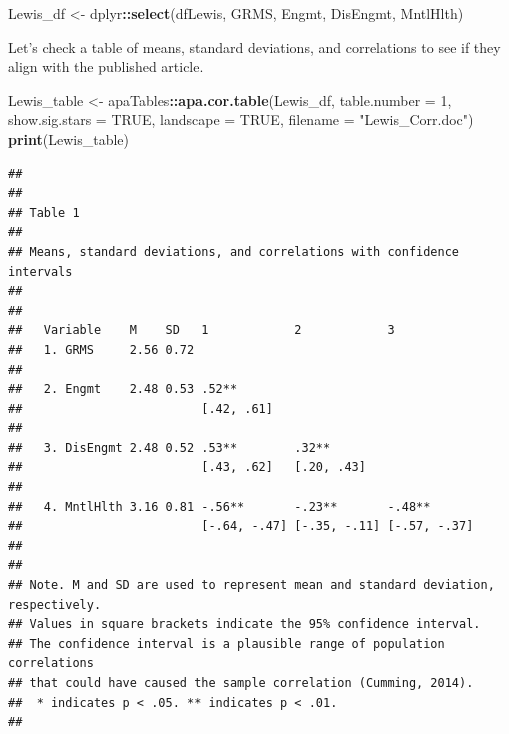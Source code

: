 \documentclass[
  11pt,
]{book}
\newenvironment{Shaded}{\begin{snugshade}}{\end{snugshade}}
\newcommand{\AttributeTok}[1]{\textcolor[rgb]{0.27,0.27,0.27}{#1}}
\newcommand{\ConstantTok}[1]{\textcolor[rgb]{0.37,0.37,0.37}{#1}}
\newcommand{\DecValTok}[1]{\textcolor[rgb]{0.06,0.06,0.06}{#1}}
\newcommand{\FunctionTok}[1]{\textcolor[rgb]{0.27,0.27,0.27}{\textbf{#1}}}
\newcommand{\NormalTok}[1]{#1}
\newcommand{\OtherTok}[1]{\textcolor[rgb]{0.37,0.37,0.37}{#1}}
\newcommand{\SpecialCharTok}[1]{\textcolor[rgb]{0.43,0.43,0.43}{\textbf{#1}}}
\newcommand{\StringTok}[1]{\textcolor[rgb]{0.5,0.5,0.5}{#1}}
\begin{document}
\begin{Shaded}
\begin{Highlighting}[]
\NormalTok{Lewis\_df }\OtherTok{\textless{}{-}}\NormalTok{ dplyr}\SpecialCharTok{::}\FunctionTok{select}\NormalTok{(dfLewis, GRMS, Engmt, DisEngmt, MntlHlth)}
\end{Highlighting}
\end{Shaded}

Let's check a table of means, standard deviations, and correlations to see if they align with the published article.

\begin{Shaded}
\begin{Highlighting}[]
\NormalTok{Lewis\_table }\OtherTok{\textless{}{-}}\NormalTok{ apaTables}\SpecialCharTok{::}\FunctionTok{apa.cor.table}\NormalTok{(Lewis\_df, }\AttributeTok{table.number =} \DecValTok{1}\NormalTok{, }\AttributeTok{show.sig.stars =} \ConstantTok{TRUE}\NormalTok{,}
    \AttributeTok{landscape =} \ConstantTok{TRUE}\NormalTok{, }\AttributeTok{filename =} \StringTok{"Lewis\_Corr.doc"}\NormalTok{)}
\FunctionTok{print}\NormalTok{(Lewis\_table)}
\end{Highlighting}
\end{Shaded}

\begin{verbatim}
## 
## 
## Table 1 
## 
## Means, standard deviations, and correlations with confidence intervals
##  
## 
##   Variable    M    SD   1            2            3           
##   1. GRMS     2.56 0.72                                       
##                                                               
##   2. Engmt    2.48 0.53 .52**                                 
##                         [.42, .61]                            
##                                                               
##   3. DisEngmt 2.48 0.52 .53**        .32**                    
##                         [.43, .62]   [.20, .43]               
##                                                               
##   4. MntlHlth 3.16 0.81 -.56**       -.23**       -.48**      
##                         [-.64, -.47] [-.35, -.11] [-.57, -.37]
##                                                               
## 
## Note. M and SD are used to represent mean and standard deviation, respectively.
## Values in square brackets indicate the 95% confidence interval.
## The confidence interval is a plausible range of population correlations 
## that could have caused the sample correlation (Cumming, 2014).
##  * indicates p < .05. ** indicates p < .01.
## 
\end{verbatim}
\end{document}
